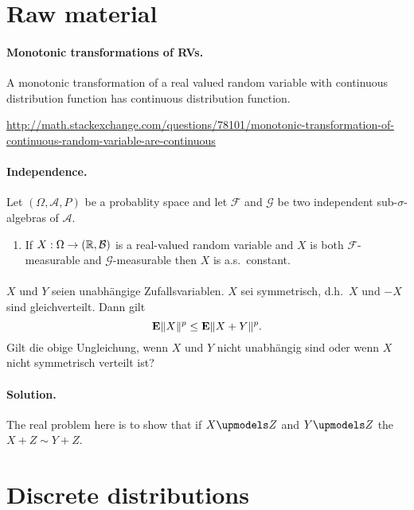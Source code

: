 
\section{Raw material}


\paragraph{Monotonic transformations of RVs.} A monotonic transformation of
a real valued random variable with continuous distribution function has
continuous distribution function. 

\url{http://math.stackexchange.com/questions/78101/monotonic-transformation-of-continuous-random-variable-are-continuous}



\paragraph{Independence. }
Let $(\Omega, \mathcal A, P)$ be a probablity space and let $\mathcal F$ and
$\mathcal G$ be two independent sub-$\sigma$-algebras of $\mathcal A$.

\begin{enumerate} 
\item If $X: \Omega \to (\mathbb R, \mathcal B)$ is a
    real-valued random variable and $X$ is both $\mathcal F$-measurable
    and $\mathcal G$-measurable then $X$ is a.s.~constant.
\end{enumerate}
\paragraph{} $X$ und $Y$ seien unabhängige Zufallsvariablen. $X$ sei symmetrisch, 
d.h.\ $X$ und $-X$ sind gleichverteilt. Dann gilt
\begin{equation}
    \mathbf{E} \| X \|^p \leq \mathbf{E} \| X + Y \|^p.
\end{equation}
Gilt die obige Ungleichung, wenn $X$ und $Y$ nicht unabhängig sind oder wenn 
$X$ nicht symmetrisch verteilt ist?

\paragraph*{Solution. } The real problem here is to show that if $X \upmodels Z$
and $Y \upmodels Z$ the $X+Z \sim Y+Z$. 


\section{Discrete distributions}

